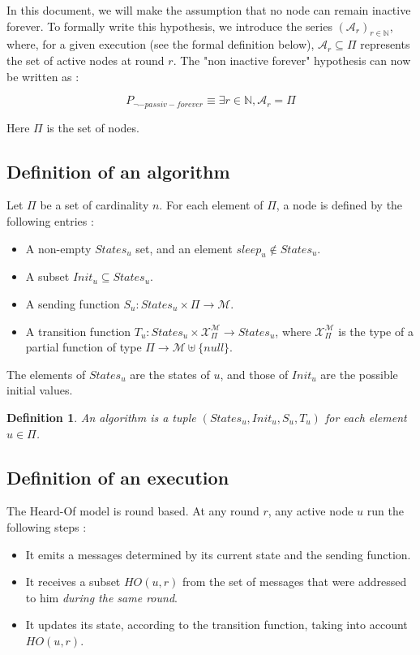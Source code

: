 \documentclass{article}
\newtheorem{definition}{Definition}
\begin{document}
In this document, we will make the assumption that no node can remain inactive forever.
To formally write this hypothesis, we introduce the series $(\mathcal{A}_r)_{r \in \mathds{N}}$, where, for a given execution (see the formal definition below), $\mathcal{A}_r \subseteq \Pi$ 
represents the set of active nodes at round $r$.
The "non inactive forever" hypothesis can now be written as :

$$P_{\neg-passiv-forever} \equiv \exists r \in \mathds{N}, \mathcal{A}_r = \Pi$$

Here $\Pi$ is the set of nodes.

\subsection{Definition of an algorithm}

Let $\Pi$ be a set of cardinality $n$. For each element of $\Pi$, a node is defined by the following entries :

\begin{itemize}
	\item A non-empty $States_u$ set, and an element $sleep_u \notin States_u$.
	\item A subset $Init_u \subseteq States_u$.
	\item A sending function $S_u : States_u \times \Pi \rightarrow \mathcal{M}$.
	\item A transition function $T_u : States_u \times \mathcal{X}_\Pi^{\mathcal{M}} \rightarrow States_u$,
		where $\mathcal{X}_\Pi^{\mathcal{M}}$ is the type of a partial function
		of type $\Pi \rightarrow \mathcal{M} \uplus \{null\}$.
\end{itemize}

The elements of $States_u$ are the states of $u$, and those of $Init_u$ are the possible initial values.

\begin{definition}
	An algorithm is a tuple $(States_u, Init_u, S_u, T_u)$ for each element $u \in \Pi$.
\end{definition}


\subsection{Definition of an execution}

The Heard-Of model is round based. At any round $r$, any active node $u$ run the following steps :

\begin{itemize}
	\item It emits a messages determined by its current state and the sending function.
	\item It receives a subset $HO(u,r)$ from the set of messages that were addressed to him
		\textit{during the same round}.
	\item It updates its state, according to the transition function, taking into account $HO(u,r)$.
\end{itemize}
\end{document}
